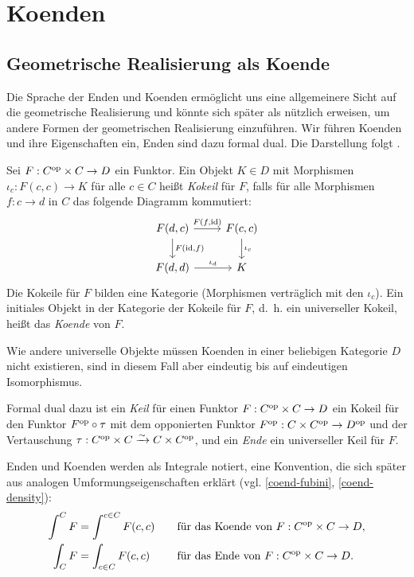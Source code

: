 \chapter{Koenden}
\label{ch:coends}

\section{Geometrische Realisierung als Koende}
\label{sec:coend-real}

Die Sprache der Enden und Koenden ermöglicht uns eine allgemeinere
Sicht auf die geometrische Realisierung und könnte sich später als
nützlich erweisen, um andere Formen der geometrischen Realisierung
einzuführen. Wir führen Koenden und ihre Eigenschaften ein, Enden sind
dazu formal dual. Die Darstellung folgt \cite{Lore}.
\begin{defn}
  Sei $F: C^\mathrm{op} \times C \to D$ ein Funktor. Ein Objekt $K \in D$ mit
  Morphismen $\iota_c: F(c, c) \to K$ für alle $c \in C$ heißt
  \emph{Kokeil} für $F$, falls für alle Morphismen $f: c \to d$ in $C$
  das folgende Diagramm kommutiert:
  \[ \begin{tikzcd}
    F(d, c) \arrow{r}{F(f, \id)} \arrow{d}{F(\id, f)}
    & F(c, c) \arrow{d}{\iota_c} \\
    F(d, d) \arrow{r}{\iota_d} & K
  \end{tikzcd} \]
  Die Kokeile für $F$ bilden eine Kategorie (Morphismen verträglich
  mit den $\iota_c$). Ein initiales Objekt in der Kategorie der
  Kokeile für $F$, d.~h. ein universeller Kokeil, heißt das
  \emph{Koende} von $F$.
\end{defn}
Wie andere universelle Objekte müssen Koenden in einer beliebigen
Kategorie $D$ nicht existieren, sind in diesem Fall aber eindeutig bis
auf eindeutigen Isomorphismus.

Formal dual dazu ist ein \emph{Keil} für einen Funktor $F: C^\mathrm{op} \times
C \to D$ ein Kokeil für den Funktor $F^\mathrm{op} \circ \tau$ mit dem
opponierten Funktor $F^\mathrm{op}: C \times C^\mathrm{op} \to D^\mathrm{op}$ und der
Vertauschung $\tau: C^\mathrm{op} \times C \xrightarrow[]{\sim} C \times C^\mathrm{op}$, und ein
\emph{Ende} ein universeller Keil für $F$.

Enden und Koenden werden als Integrale notiert, eine Konvention, die
sich später aus analogen Umformungseigenschaften erklärt
(vgl. \ref{coend-fubini}, \ref{coend-density}):
\begin{alignat*}{2}
  \int^C F &= \int^{c \in C} F(c, c)
  \quad &&\text{für das Koende von } F: C^\mathrm{op} \times C \to D, \\
  \int_C F &= \int_{c \in C} F(c, c)
  && \text{für das Ende von } F: C^\mathrm{op} \times C \to D.
\end{alignat*}

